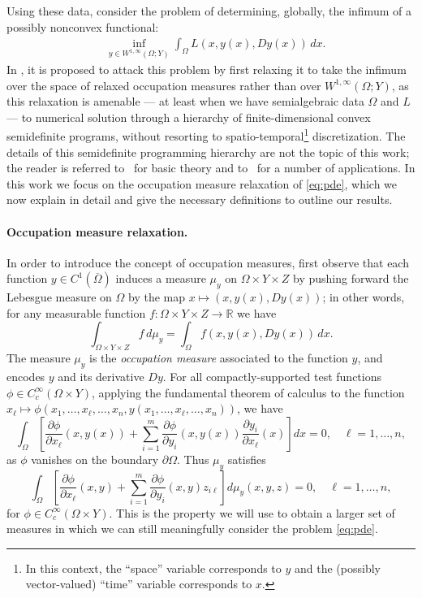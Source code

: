 \documentclass{article}
\newcommand{\R}{\mathbb{R}}
\theoremstyle{definition}
\theoremstyle{remark}
\begin{document}
Using these data, consider the problem of determining, globally, the infimum of a possibly nonconvex functional:
\begin{align}\label{eq:pde}
 &\inf\limits_{y \in W^{1,\infty}(\Omega;Y)}  \displaystyle\int_{\Omega} L(x,y(x),D y(x))\, dx.
\end{align}
In \cite{korda2018moments}, it is proposed to attack this problem by first relaxing it to take the infimum over the space of relaxed occupation measures rather than over $W^{1,\infty}(\Omega;Y)$, as this relaxation is amenable --- at least when we have semialgebraic data $\Omega$ and $L$ --- to numerical solution through a hierarchy of finite-dimensional convex semidefinite programs, without resorting to spatio-temporal\footnote{In this context, the ``space'' variable corresponds to $y$ and the (possibly vector-valued) ``time'' variable corresponds to $x$.} discretization. The details of this semidefinite programming hierarchy are not the topic of this work; the reader is referred to~\cite{lasserre2009moments} for basic theory and to~\cite{henrion2020moment} for a number of applications. In this work we focus on the occupation measure relaxation of \eqref{eq:pde}, which we now explain in detail and give the necessary definitions to outline our results.%

\paragraph{Occupation measure relaxation.}
%
In order to introduce the concept of occupation measures, first observe that each function $y\in C^1(\overline\Omega)$ induces a measure $\mu_y$ on $\Omega\times Y\times Z$ by pushing forward 
the Lebesgue measure on $\Omega$ by the map $x\mapsto (x,y(x),Dy(x))$; in other words, for any measurable function $f\colon \Omega\times Y\times Z\to\R$ we have
%
\[\int_{\Omega\times Y\times Z}f\,d\mu_y=\int_\Omega f(x,y(x),Dy(x))\,dx.\]
The measure $\mu_y$ is the \emph{occupation measure} associated to the function $y$, and encodes $y$ and its derivative $Dy$.
For all compactly-supported test functions $\phi\in C_c^\infty(\Omega\times Y)$, applying the fundamental theorem of calculus to the function $x_\ell\mapsto \phi(x_1,\dots,x_\ell,\dots,x_n,y(x_1,\dots,x_\ell,\dots,x_n))$, we have
\[\int_\Omega\left[\frac{\partial\phi}{\partial x_\ell}(x,y(x))+\sum_{i=1}^m\frac{\partial\phi}{\partial y_i}(x,y(x))\frac{\partial y_i}{\partial x_\ell}(x)\right]dx=0,\quad \ell=1,\dots,n,
\]
as $\phi$ vanishes on the boundary $\partial\Omega$.
Thus $\mu_y$ satisfies
\[\int_\Omega\left[\frac{\partial\phi}{\partial x_\ell}(x,y)+\sum_{i=1}^m\frac{\partial\phi}{\partial y_i}(x,y)z_{i\ell}\right]d\mu_y(x,y,z)=0,\quad \ell=1,\dots,n,\]
for $\phi\in C_c^\infty(\Omega\times Y)$. This is the property we will use to obtain a %
larger set of measures in which we can still meaningfully consider the problem \eqref{eq:pde}.
\end{document}
